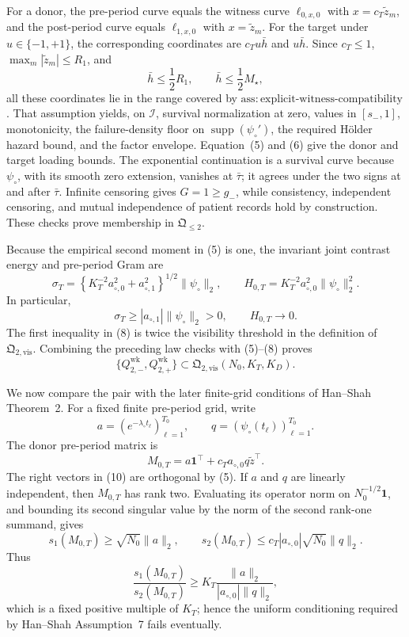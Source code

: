 For a donor, the pre-period curve equals the witness curve \(\ell_{0,x,0}\) with \(x=c_T\widetilde z_m\), and the post-period curve equals \(\ell_{1,x,0}\) with \(x=\widetilde z_m\).  For the target under \(u\in\{-1,+1\}\), the corresponding coordinates are \(c_Tu\bar h\) and \(u\bar h\).  Since \(c_T\le1\), \(\max_m|\widetilde z_m|\le R_1\), and
\[
 \bar h\le\frac12R_1,
 \qquad
 \bar h\le\frac12M_\star,
 \tag{6}
\]
all these coordinates lie in the range covered by \(\mathrm{ass:explicit\mbox{-}witness\mbox{-}compatibility}\).  That assumption yields, on \(\mathcal I\), survival normalization at zero, values in \([s_-,1]\), monotonicity, the failure-density floor on \(\operatorname{supp}(\psi_\circ')\), the required H\"older hazard bound, and the factor envelope.  Equation~(5) and (6) give the donor and target loading bounds.  The exponential continuation is a survival curve because \(\psi_\circ\), with its smooth zero extension, vanishes at \(\bar\tau\); it agrees under the two signs at and after \(\bar\tau\).  Infinite censoring gives \(G=1\ge g_-\), while consistency, independent censoring, and mutual independence of patient records hold by construction.  These checks prove membership in \(\mathfrak Q_{\leq2}\).

Because the empirical second moment in (5) is one, the invariant joint contrast energy and pre-period Gram are
\[
 \sigma_T
 =\left\{K_T^{-2}a_{\circ,0}^2+a_{\circ,1}^2\right\}^{1/2}
   \|\psi_\circ\|_2,
 \qquad
 H_{0,T}=K_T^{-2}a_{\circ,0}^2\|\psi_\circ\|_2^2.
 \tag{7}
\]
In particular,
\[
 \sigma_T\ge |a_{\circ,1}|\|\psi_\circ\|_2>0,
 \qquad
 H_{0,T}\longrightarrow0.
 \tag{8}
\]
The first inequality in (8) is twice the visibility threshold in the definition of \(\mathfrak Q_{2,\mathrm{vis}}\).  Combining the preceding law checks with (5)--(8) proves
\[
 \{Q_{2,-}^{\mathrm{wk}},Q_{2,+}^{\mathrm{wk}}\}
 \subset\mathfrak Q_{2,\mathrm{vis}}(N_0,K_T,K_D).
 \tag{9}
\]

We now compare the pair with the later finite-grid conditions of Han--Shah Theorem~2.  For a fixed finite pre-period grid, write
\[
 a=(e^{-\lambda_\circ t_\ell})_{\ell=1}^{T_0},
 \qquad
 q=(\psi_\circ(t_\ell))_{\ell=1}^{T_0}.
\]
The donor pre-period matrix is
\[
 M_{0,T}=a\mathbf1^\top+c_Ta_{\circ,0}q\widetilde z^\top.
 \tag{10}
\]
The right vectors in (10) are orthogonal by (5).  If \(a\) and \(q\) are linearly independent, then \(M_{0,T}\) has rank two.  Evaluating its operator norm on \(N_0^{-1/2}\mathbf1\), and bounding its second singular value by the norm of the second rank-one summand, gives
\[
 s_1(M_{0,T})\ge\sqrt{N_0}\|a\|_2,
 \qquad
 s_2(M_{0,T})\le c_T|a_{\circ,0}|\sqrt{N_0}\|q\|_2.
 \tag{11}
\]
Thus
\[
 \frac{s_1(M_{0,T})}{s_2(M_{0,T})}
 \ge
 K_T\frac{\|a\|_2}{|a_{\circ,0}|\|q\|_2},
 \tag{12}
\]
which is a fixed positive multiple of \(K_T\); hence the uniform conditioning required by Han--Shah Assumption~7 fails eventually.

